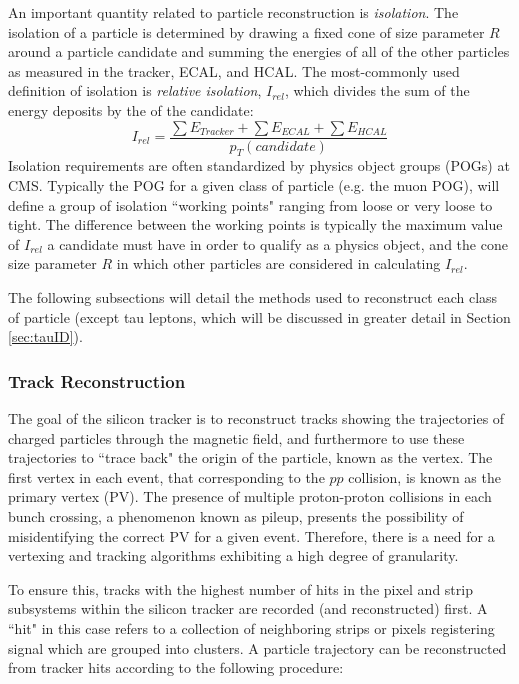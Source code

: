 An important quantity related to particle reconstruction is \textit{isolation}. The isolation of a particle is determined by drawing a fixed cone of size parameter $R$ around a particle candidate and summing the energies of all of the other particles as measured in the tracker, ECAL, and HCAL. The most-commonly used definition of isolation is \textit{relative isolation}, $I_{rel}$, which divides the sum of the energy deposits by the \pt of the candidate:
\begin{equation} \label{eq:iso}
I_{rel} = \frac{\sum E_{Tracker} + \sum E_{ECAL} + \sum E_{HCAL}}{p_T(candidate)}
\end{equation}
\noindent Isolation requirements are often standardized by physics object groups (POGs) at CMS. Typically the POG for a given class of particle (e.g. the muon POG), will define a group of isolation ``working points" ranging from loose or very loose to tight. The difference between the working points is typically the maximum value of $I_{rel}$ a candidate must have in order to qualify as a physics object, and the cone size parameter $R$ in which other particles are considered in calculating $I_{rel}$.

The following subsections will detail the methods used to reconstruct each class of particle (except tau leptons, which will be discussed in greater detail in Section \ref{sec:tauID}).

\subsubsection{Track Reconstruction}\label{sec:TrackReco}

The goal of the silicon tracker is to reconstruct tracks showing the trajectories of charged particles through the magnetic field, and furthermore to use these trajectories to ``trace back" the origin of the particle, known as the vertex. The first vertex in each event, that corresponding to the $pp$ collision, is known as the primary vertex (PV). The presence of multiple proton-proton collisions in each bunch crossing, a phenomenon known as pileup, presents the possibility of misidentifying the correct PV for a given event. Therefore, there is a need for a vertexing and tracking algorithms exhibiting a high degree of granularity.

To ensure this, tracks with the highest number of hits in the pixel and strip subsystems within the silicon tracker are recorded (and reconstructed) first. A ``hit" in this case refers to a collection of neighboring strips or pixels registering signal which are grouped into clusters. A particle trajectory can be reconstructed from tracker hits according to the following procedure\cite{TrackReco}:


